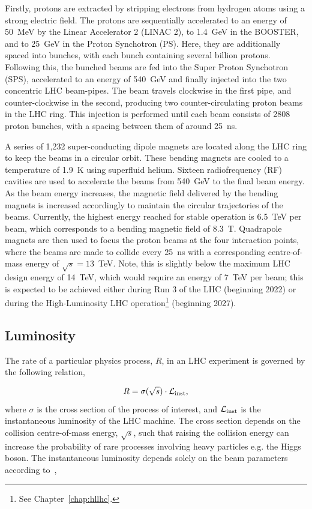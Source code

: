 Firstly, protons are extracted by stripping electrons from hydrogen atoms using a strong electric field. The protons are sequentially accelerated to an energy of 50~MeV by the Linear Accelerator 2 (LINAC 2), to 1.4~GeV in the BOOSTER, and to 25~GeV in the Proton Synchotron (PS). Here, they are additionally spaced into bunches, with each bunch containing several billion protons. Following this, the bunched beams are fed into the Super Proton Synchotron (SPS), accelerated to an energy of 540~GeV and finally injected into the two concentric LHC beam-pipes. The beam travels clockwise in the first pipe, and counter-clockwise in the second, producing two counter-circulating proton beams in the LHC ring. This injection is performed until each beam consists of 2808 proton bunches, with a spacing between them of around 25~ns.

A series of 1,232 super-conducting dipole magnets are located along the LHC ring to keep the beams in a circular orbit. These bending magnets are cooled to a temperature of 1.9~K using superfluid helium. Sixteen radiofrequency (RF) cavities are used to accelerate the beams from 540~GeV to the final beam energy. As the beam energy increases, the magnetic field delivered by the bending magnets is increased accordingly to maintain the circular trajectories of the beams. Currently, the highest energy reached for stable operation is 6.5~TeV per beam, which corresponds to a bending magnetic field of 8.3~T. Quadrapole magnets are then used to focus the proton beams at the four interaction points, where the beams are made to collide every 25~ns with a corresponding centre-of-mass energy of $\sqrt{s}=13$~TeV. Note, this is slightly below the maximum LHC design energy of 14~TeV, which would require an energy of 7~TeV per beam; this is expected to be achieved either during Run 3 of the LHC (beginning 2022) or during the High-Luminosity LHC operation\footnote{See Chapter~\ref{chap:hllhc}.} (beginning 2027).

\subsection{Luminosity}
The rate of a particular physics process, $R$, in an LHC experiment is governed by the following relation,

\begin{equation}\label{eq:lumi_rate}
    R = \sigma(\sqrt{s}) \cdot \mathcal{L}_{\rm{inst}},
\end{equation}
\noindent
where $\sigma$ is the cross section of the process of interest, and $\mathcal{L}_{\rm{inst}}$ is the instantaneous luminosity of the LHC machine. The cross section depends on the collision centre-of-mass energy, $\sqrt{s}$, such that raising the collision energy can increase the probability of rare processes involving heavy particles e.g. the Higgs boson. The instantaneous luminosity depends solely on the beam parameters according to~\cite{1748-0221-3-08-S08001},

